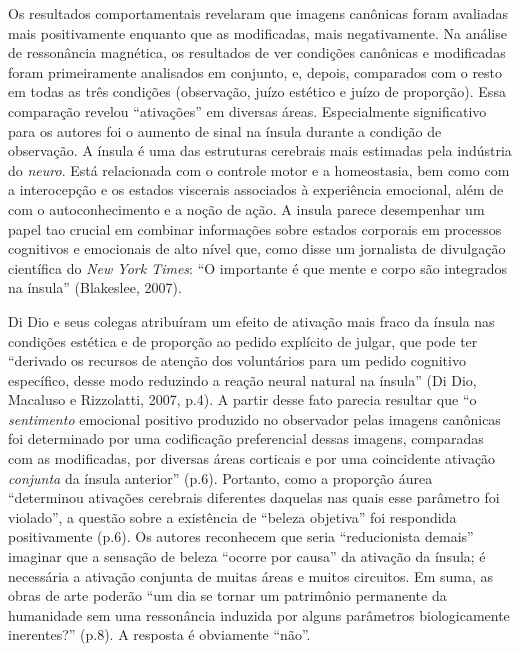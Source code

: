 Os resultados comportamentais revelaram que imagens canônicas foram
avaliadas mais positivamente enquanto que as modificadas, mais
negativamente. Na análise de ressonância magnética, os resultados de ver
condições canônicas e modificadas foram primeiramente analisados em
conjunto, e, depois, comparados com o resto em todas as três condições
(observação, juízo estético e juízo de proporção). Essa comparação
revelou ``ativações'' em diversas áreas. Especialmente significativo
para os autores foi o aumento de sinal na ínsula durante a condição de
observação. A ínsula é uma das estruturas cerebrais mais estimadas pela
indústria do \emph{neuro}. Está relacionada com o controle motor e a
homeostasia, bem como com a interocepção e os estados viscerais
associados à experiência emocional, além de com o autoconhecimento e a
noção de ação. A insula parece desempenhar um papel tao crucial em
combinar informações sobre estados corporais em processos cognitivos e
emocionais de alto nível que, como disse um jornalista de divulgação
científica do \emph{New York Times}: ``O importante é que mente e corpo
são integrados na ínsula'' (Blakeslee, 2007).

Di Dio e seus colegas atribuíram um efeito de ativação mais fraco da
ínsula nas condições estética e de proporção ao pedido explícito de
julgar, que pode ter ``derivado os recursos de atenção dos voluntários
para um pedido cognitivo específico, desse modo reduzindo a reação
neural natural na ínsula'' (Di Dio, Macaluso e Rizzolatti, 2007, p.4). A
partir desse fato parecia resultar que ``o \emph{sentimento} emocional
positivo produzido no observador pelas imagens canônicas foi determinado
por uma codificação preferencial dessas imagens, comparadas com as
modificadas, por diversas áreas corticais e por uma coincidente ativação
\emph{conjunta} da ínsula anterior'' (p.6). Portanto, como a proporção
áurea ``determinou ativações cerebrais diferentes daquelas nas quais
esse parâmetro foi violado'', a questão sobre a existência de ``beleza
objetiva'' foi respondida positivamente (p.6). Os autores reconhecem que
seria ``reducionista demais'' imaginar que a sensação de beleza ``ocorre
por causa'' da ativação da ínsula; é necessária a ativação conjunta de
muitas áreas e muitos circuitos. Em suma, as obras de arte poderão ``um
dia se tornar um patrimônio permanente da humanidade sem uma ressonância
induzida por alguns parâmetros biologicamente inerentes?'' (p.8). A
resposta é obviamente ``não''.

